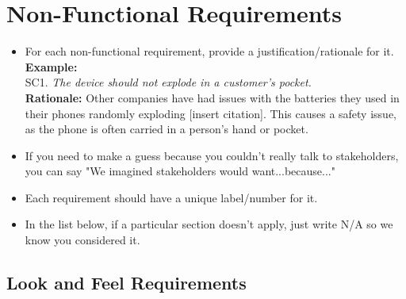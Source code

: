 \documentclass[]{article}
\begin{document}

\section{Non-Functional Requirements}
\label{sec:non-functional_requirements}


\begin{itemize}
	\item For each non-functional requirement, provide a justification/rationale for it.\\
	{\bf Example:} \\
	SC1. \emph{The device should not explode in a customer's pocket.}\\
	{\bf Rationale:} Other companies have had issues with the batteries they used in their phones randomly exploding [insert citation]. This causes a safety issue, as the phone is often carried in a person's hand or pocket.	
	\item If you need to make a guess because you couldn't really talk to stakeholders, you can say "We imagined stakeholders would want...because..."
	\item Each requirement should have a unique label/number for it.
	\item In the list below, if a particular section doesn't apply, just write N/A so we know you considered it.
\end{itemize}

\subsection{Look and Feel Requirements}
\label{sub:look_and_feel_requirements}
\end{document}
